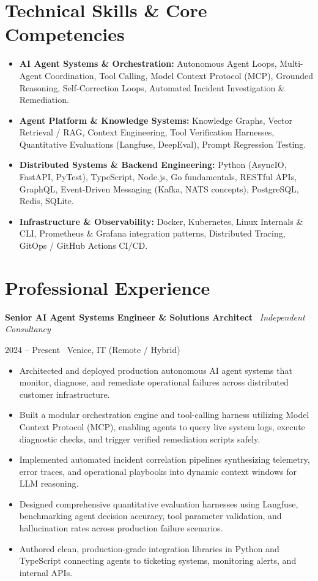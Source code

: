 \documentclass[a4paper,10pt]{article}
\newcommand{\role}[4]{%
  \vspace{2pt}\noindent
  \begin{minipage}[t]{0.70\textwidth}\raggedright\textbf{#1} \textbullet\ \textit{#3}\end{minipage}%
  \hfill
  \begin{minipage}[t]{0.28\textwidth}\raggedleft\footnotesize\color{gray}#2 \textbullet\ #4\end{minipage}%
  \vspace{1pt}%
}
\begin{document}
\section{Technical Skills \& Core Competencies}
\begin{itemize}[leftmargin=1.2em, itemsep=2pt]
  \item \textbf{AI Agent Systems \& Orchestration:} Autonomous Agent Loops, Multi-Agent Coordination, Tool Calling, Model Context Protocol (MCP), Grounded Reasoning, Self-Correction Loops, Automated Incident Investigation \& Remediation.
  \item \textbf{Agent Platform \& Knowledge Systems:} Knowledge Graphs, Vector Retrieval / RAG, Context Engineering, Tool Verification Harnesses, Quantitative Evaluations (Langfuse, DeepEval), Prompt Regression Testing.
  \item \textbf{Distributed Systems \& Backend Engineering:} Python (AsyncIO, FastAPI, PyTest), TypeScript, Node.js, Go fundamentals, RESTful APIs, GraphQL, Event-Driven Messaging (Kafka, NATS concepts), PostgreSQL, Redis, SQLite.
  \item \textbf{Infrastructure \& Observability:} Docker, Kubernetes, Linux Internals \& CLI, Prometheus \& Grafana integration patterns, Distributed Tracing, GitOps / GitHub Actions CI/CD.
\end{itemize}

\section{Professional Experience}

\role{Senior AI Agent Systems Engineer \& Solutions Architect}{2024 -- Present}{Independent Consultancy}{Venice, IT (Remote / Hybrid)}
\begin{itemize}
  \item Architected and deployed production autonomous AI agent systems that monitor, diagnose, and remediate operational failures across distributed customer infrastructure.
  \item Built a modular orchestration engine and tool-calling harness utilizing Model Context Protocol (MCP), enabling agents to query live system logs, execute diagnostic checks, and trigger verified remediation scripts safely.
  \item Implemented automated incident correlation pipelines synthesizing telemetry, error traces, and operational playbooks into dynamic context windows for LLM reasoning.
  \item Designed comprehensive quantitative evaluation harnesses using Langfuse, benchmarking agent decision accuracy, tool parameter validation, and hallucination rates across production failure scenarios.
  \item Authored clean, production-grade integration libraries in Python and TypeScript connecting agents to ticketing systems, monitoring alerts, and internal APIs.
\end{itemize}
\end{document}
